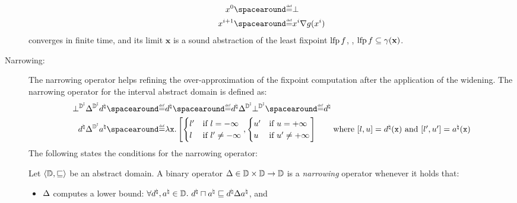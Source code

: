 \begin{description}
\begin{theorem}
\begin{align*}
      x^0 &\DefeQ \abstractdomainbottom \\
      x^{i+1} &\DefeQ x^i \abstractdomainwidening g(x^i)
    \end{align*}
    converges in finite time, and its limit $\textbf{x}$ is a sound abstraction of the least fixpoint $\operatorname{lfp} f$, \ie, $\operatorname{lfp} f \subseteq \gamma(\textbf{x})$.
  \end{theorem}
\item[Narrowing:]
  The narrowing operator helps refining the over-approximation of the fixpoint computation after the application of the widening.
  The narrowing operator for the interval abstract domain is defined as:
  \begin{align*}
    \intervalabstractdomainbottom \intervalabstractdomainnarrowing \defabstractvalue &\DefeQ \defabstractvalue \DefeQ \defabstractvalue \intervalabstractdomainnarrowing \intervalabstractdomainbottom \DefeQ \defabstractvalue \\
    \defabstractvalue \intervalabstractdomainnarrowing \defotherabstractvalue &\DefeQ \lambda \defvariable.
    \left[
      \begin{cases}
        l' & \text{if } l = -\infty \\
        l & \text{if } l' \neq -\infty
      \end{cases},
      \begin{cases}
        u' & \text{if } u = +\infty \\
        u & \text{if } u' \neq +\infty
      \end{cases}
    \right]
    \tag*{where $\interval{l}{u} = \defabstractvalue(\defvariable)$ and $\interval{l'}{u'} = \defotherabstractvalue(\defvariable)$}
  \end{align*}
  The following states the conditions for the narrowing operator:
  \begin{definition}[Narrowing]
    Let $\langle \mathbb{D}, \sqsubseteq \rangle$ be an abstract domain.
    A binary operator $\Delta\in\mathbb{D}\times\mathbb{D}\to\mathbb{D}$ is a \emph{narrowing} operator whenever it holds that:
    \begin{itemize}
      \item $\Delta$ computes a lower bound: $\forall d^\natural, a^\natural \in \mathbb{D}.~  d^\natural \sqcap a^\natural \sqsubseteq d^\natural \Delta a^\natural$, and

\end{itemize}
\end{definition}
\end{description}
